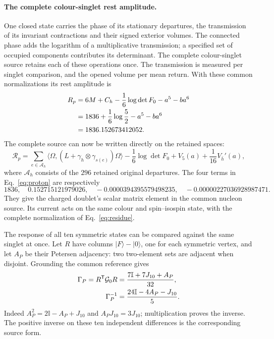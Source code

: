 \documentclass[aps,prx,onecolumn,10pt,notitlepage,nofootinbib,longbibliography]{revtex4-2}
\numberwithin{equation}{section}
\numberwithin{table}{section}
\newcommand{\Id}{\mathbb I}
\begin{document}
\paragraph*{The complete colour-singlet rest amplitude.}
One closed state carries the phase of its stationary departures, the transmission of its invariant contractions and their signed exterior volumes. The connected phase adds the logarithm of a multiplicative transmission; a specified set of occupied components contributes its determinant. The complete colour-singlet source retains each of these operations once. The transmission is measured per singlet comparison, and the opened volume per mean return. With these common normalizations its rest amplitude is
\begin{align}
 R_p
 &=6M+C_h-\frac16\log\det F_0-a^5-ba^6\notag\\
 &=1836+\frac16\log\frac52-a^5-ba^6\notag\\
 &=1836.152673412052.
 \label{eq:proton}
\end{align}
The complete source can now be written directly on the retained spaces:
\begin{equation}
 \mathcal R_p=
 \sum_{e\in\mathcal A_h}\langle\Omega,(L+\gamma_h\otimes\gamma_{s(e)})\Omega\rangle
 -\frac16\log\det F_0+V_5(a)+\frac1{16}V_{\bar h}'(a),
 \label{eq:completeprotonsource}
\end{equation}
where $\mathcal A_h$ consists of the $296$ retained original departures.
 The four terms in Eq.~\eqref{eq:proton} are respectively
\begin{equation}
 1836,\quad 0.152715121979026,\quad
 -0.0000394395579498235,\quad -0.00000227036928987471.
\end{equation}
They give the charged doublet's scalar matrix element in the common nucleon source. Its current acts on the same colour and spin--isospin state, with the complete normalization of Eq.~\eqref{eq:residue}.

The response of all ten symmetric states can be compared against the same singlet at once. Let $R$ have columns $\lvert F\rangle-\lvert0\rangle$, one for each symmetric vertex, and let $A_P$ be their Petersen adjacency: two two-element sets are adjacent when disjoint. Grounding the common reference gives
\begin{align}
 \Gamma_P=R^{\mathsf T}{\mathcal G_0}R&=\frac{7\Id+7J_{10}+A_P}{32},\notag\\
 \Gamma_P^{-1}&=\frac{24\Id-4A_P-J_{10}}5.
 \label{eq:groundedpetersen}
\end{align}
Indeed $A_P^2=2\Id-A_P+J_{10}$ and $A_PJ_{10}=3J_{10}$; multiplication proves the inverse. The positive inverse on these ten independent differences is the corresponding source form.
\end{document}

